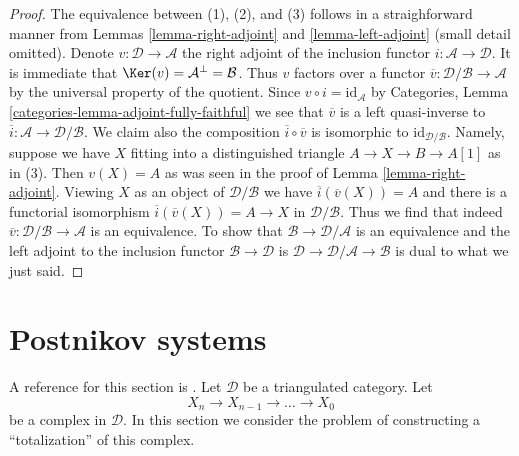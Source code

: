 \begin{proof}
The equivalence between (1), (2), and (3) follows in a straighforward manner
from Lemmas \ref{lemma-right-adjoint} and \ref{lemma-left-adjoint} (small
detail omitted). Denote $v : \mathcal{D} \to \mathcal{A}$ the right
adjoint of the inclusion functor $i : \mathcal{A} \to \mathcal{D}$.
It is immediate that $\Ker(v) = \mathcal{A}^\perp = \mathcal{B}$.
Thus $v$ factors over a functor
$\overline{v} : \mathcal{D}/\mathcal{B} \to \mathcal{A}$
by the universal property of the quotient. Since
$v \circ i = \text{id}_\mathcal{A}$ by
Categories, Lemma \ref{categories-lemma-adjoint-fully-faithful}
we see that $\overline{v}$ is a left quasi-inverse to
$\overline{i} : \mathcal{A} \to \mathcal{D}/\mathcal{B}$.
We claim also the composition $\overline{i} \circ \overline{v}$
is isomorphic to $\text{id}_{\mathcal{D}/\mathcal{B}}$.
Namely, suppose we have $X$ fitting into a distinguished triangle
$A \to X \to B \to A[1]$ as in (3). Then $v(X) = A$ as was seen
in the proof of Lemma \ref{lemma-right-adjoint}.
Viewing $X$ as an object of $\mathcal{D}/\mathcal{B}$
we have $\overline{i}(\overline{v}(X)) = A$ and there
is a functorial isomorphism $\overline{i}(\overline{v}(X)) = A \to X$
in $\mathcal{D}/\mathcal{B}$. Thus we find that indeed
$\overline{v} : \mathcal{D}/\mathcal{B} \to \mathcal{A}$
is an equivalence. To show that
$\mathcal{B} \to \mathcal{D}/\mathcal{A}$ is an equivalence and
the left adjoint to the inclusion functor $\mathcal{B} \to \mathcal{D}$
is $\mathcal{D} \to \mathcal{D}/\mathcal{A} \to \mathcal{B}$
is dual to what we just said.
\end{proof}




\section{Postnikov systems}
\label{section-postnikov}

\noindent
A reference for this section is \cite{Orlov-K3}. Let $\mathcal{D}$
be a triangulated category. Let
$$
X_n \to X_{n - 1} \to \ldots \to X_0
$$
be a complex in $\mathcal{D}$. In this section we consider the problem
of constructing a ``totalization'' of this complex.

